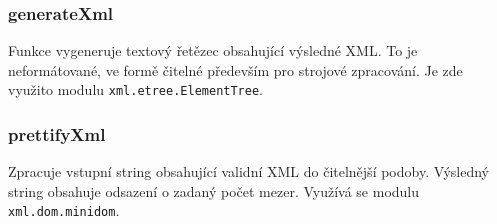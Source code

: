 \documentclass[a4paper, 10pt]{article}[19.04.2013]
\begin{document}
\subsubsection*{{\bf generateXml}}
Funkce vygeneruje textový řetězec obsahující výsledné XML. To je neformátované,
ve formě čitelné především pro strojové zpracování. Je zde využito modulu
\texttt{xml.etree.ElementTree}.

\subsubsection*{{\bf prettifyXml}}
Zpracuje vstupní string obsahující validní XML do čitelnější podoby.
Výsledný string obsahuje odsazení o zadaný počet mezer. Využívá se modulu
\texttt{xml.dom.minidom}. 
\end{document}
